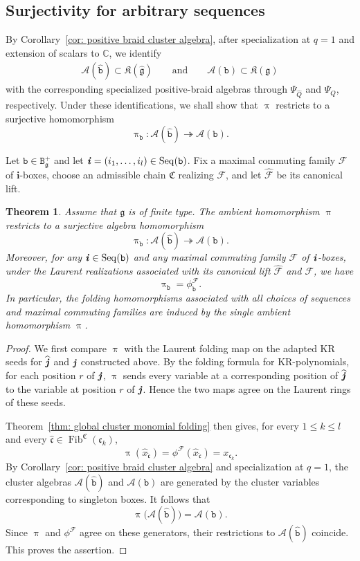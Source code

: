 \documentclass[12pt, leqno]{amsart}
\numberwithin{equation}{section}
\theoremstyle{plain}
\newtheorem{theorem}[lemma]{Theorem}
\theoremstyle{definition}
\renewcommand{\le}{\leqslant}
\newcommand{\g}{\mathfrak{g}}
\newcommand{\C}{\mathbb{C}}
\newcommand{\ii}{ \textbf{\textit{i}}}
\newcommand{\jj}{ \textbf{\textit{j}}}
\newcommand{\Fib}{\operatorname{Fib}}
\newcommand{\hQ}{\widehat{Q}}
\newcommand{\hg}{{\widehat{\g}}}
\newcommand{\hx}{\widehat{x}}
\newcommand{\hjj}{{\widehat{\jj}}}
\newcommand{\frakC}{\mathfrak{C}}
\newcommand{\frakK}{\mathfrak{K}}
\newcommand{\frakc}{\mathfrak{c}}
\newcommand{\hfrakc}{\widehat{\frakc}}
\newcommand{\bfi}{\mathbf{i}}
\newcommand{\calA}{\mathcal{A}}
\newcommand{\calF}{\mathcal{F}}
\newcommand{\hcalF}{{\widehat{\calF}}}
\newcommand{\ttB}{\mathtt{B}}
\newcommand{\ttb}{\mathtt{b}}
\newcommand{\httb}{\widehat{\ttb}}
\newcommand{\Seq}{\mathrm{Seq}}
\begin{document}
\subsection{Surjectivity for arbitrary sequences}
By Corollary~\ref{cor: positive braid cluster algebra}, after
specialization at $q=1$ and extension of scalars to $\C$, we identify
\begin{align} \label{eq: identi}
\calA(\httb)\subset\frakK(\hg)
\qquad\text{and}\qquad
\calA(\ttb)\subset\frakK(\g)
\end{align}
with the corresponding specialized positive-braid algebras through
$\Psi_{\hQ}$ and $\Psi_Q$, respectively.
Under these
identifications, we shall show that $\uppi$ restricts to a surjective
homomorphism
\[
\uppi_\ttb:\calA(\httb)\twoheadrightarrow\calA(\ttb).
\]

{}

Let $\ttb\in\ttB_\g^+$ and let
$\ii=(i_1,\ldots,i_l)\in\Seq(\ttb)$.  Fix a maximal commuting
family $\calF$ of $\bfi$-boxes, choose an admissible chain $\frakC$
realizing $\calF$, and let $\hcalF$ be its canonical lift.

\begin{theorem}
\label{thm: surjectivity arbitrary sequences}
Assume that $\g$ is of finite type.  The ambient homomorphism $\uppi$
restricts to a surjective algebra homomorphism
\[
\uppi_\ttb:
\calA(\httb)\twoheadrightarrow\calA(\ttb).
\]
Moreover, for any $\ii\in\Seq(\ttb)$ and any maximal commuting family
$\calF$ of $\ii$-boxes, under the Laurent realizations associated with
its canonical lift $\hcalF$ and $\calF$, we have
\[
\uppi_\ttb=\phi^\calF_\ttb.
\]
In particular, the folding homomorphisms associated with all choices
of sequences and maximal commuting families are induced by the single
ambient homomorphism $\uppi$.
\end{theorem}

\begin{proof}
 We first compare $\uppi$ with the Laurent folding map on the
adapted KR seeds for $\hjj$ and $\jj$ constructed above.
By the folding formula for KR-polynomials, for each position $r$ of
$\jj$, $\uppi$ sends every variable at a corresponding position of
$\hjj$ to the variable at position $r$ of $\jj$. Hence the two maps agree on the
Laurent rings of these seeds.

Theorem~\ref{thm: global cluster monomial folding} then gives, for
every $1\le k\le l$ and every
$\hfrakc\in\Fib^\frakC(\frakc_k)$,
\[
\uppi(\hx_{\hfrakc}) = \phi^\calF(\hx_{\hfrakc}) = x_{\frakc_k}.
\]
By Corollary~\ref{cor: positive braid cluster algebra} and
specialization at $q=1$, the cluster algebras
$\calA(\httb)$ and $\calA(\ttb)$ are generated by the cluster
variables corresponding to singleton boxes.  It follows that
\[
\uppi\bigl(\calA(\httb)\bigr)=\calA(\ttb).
\]
Since $\uppi$ and $\phi^\calF$ agree on these generators, their
restrictions to $\calA(\httb)$ coincide.  This proves the assertion.
\end{proof}
\end{document}
